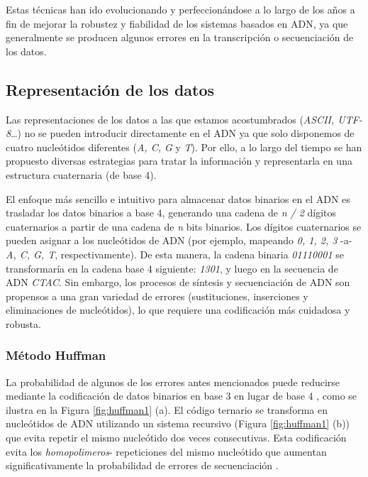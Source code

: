 \documentclass[a4paper,11pt]{article}
\begin{document}
Estas técnicas han ido evolucionando y perfeccionándose a lo largo de los años a fin de mejorar la robustez y fiabilidad de los sistemas basados en ADN, ya que generalmente se producen algunos errores en la transcripción o secuenciación de los datos.

\subsection{Representación de los datos}

Las representaciones de los datos a las que estamos acostumbrados (\textit{ASCII, UTF-8}…) no se pueden introducir directamente en el ADN ya que solo disponemos de cuatro nucleótidos diferentes (\textit{A, C, G} y \textit{T}). Por ello, a lo largo del tiempo se han propuesto diversas estrategias para tratar la información y representarla en una estructura cuaternaria (de base 4).

El enfoque más sencillo e intuitivo para almacenar datos binarios en el ADN es trasladar los datos binarios a base 4, generando una cadena de \textit{n / 2} dígitos cuaternarios a partir de una cadena de \textit{n} bits binarios. Los dígitos cuaternarios se pueden asignar a los nucleótidos de ADN (por ejemplo, mapeando \textit{0, 1, 2, 3} -a- \textit{A, C, G, T}, respectivamente). De esta manera, la cadena binaria \textit{01110001} se transformaría en la cadena base 4 siguiente: \textit{1301}, y luego en la secuencia de ADN \textit{CTAC}. Sin embargo, los procesos de síntesis y secuenciación de ADN son propensos a una gran variedad de errores (sustituciones, inserciones y eliminaciones de nucleótidos), lo que requiere una codificación más cuidadosa y robusta.

\subsubsection{Método Huffman}

La probabilidad de algunos de los errores antes mencionados puede reducirse mediante la codificación de datos binarios en base 3 en lugar de base 4 \citep{Goldman2013}, como se ilustra en la Figura \ref{fig:huffman1} (a). El código ternario se transforma en nucleótidos de ADN utilizando un sistema recursivo (Figura \ref{fig:huffman1} (b)) que evita repetir el mismo nucleótido dos veces consecutivas. Esta codificación evita los \textit{homopolimeros}- repeticiones del mismo nucleótido que aumentan significativamente la probabilidad de errores de secuenciación \citep{Niedringhaus2011}.
\end{document}
